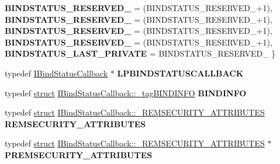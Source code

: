 \begin{DoxyCompactItemize}
{\bfseries B\+I\+N\+D\+S\+T\+A\+T\+U\+S\+\_\+\+R\+E\+S\+E\+R\+V\+E\+D\+\_} = (B\+I\+N\+D\+S\+T\+A\+T\+U\+S\+\_\+\+R\+E\+S\+E\+R\+V\+E\+D\+\_+1), 
\newline
{\bfseries B\+I\+N\+D\+S\+T\+A\+T\+U\+S\+\_\+\+R\+E\+S\+E\+R\+V\+E\+D\+\_} = (B\+I\+N\+D\+S\+T\+A\+T\+U\+S\+\_\+\+R\+E\+S\+E\+R\+V\+E\+D\+\_+1), 
{\bfseries B\+I\+N\+D\+S\+T\+A\+T\+U\+S\+\_\+\+R\+E\+S\+E\+R\+V\+E\+D\+\_} = (B\+I\+N\+D\+S\+T\+A\+T\+U\+S\+\_\+\+R\+E\+S\+E\+R\+V\+E\+D\+\_+1), 
{\bfseries B\+I\+N\+D\+S\+T\+A\+T\+U\+S\+\_\+\+R\+E\+S\+E\+R\+V\+E\+D\+\_} = (B\+I\+N\+D\+S\+T\+A\+T\+U\+S\+\_\+\+R\+E\+S\+E\+R\+V\+E\+D\+\_+1), 
{\bfseries B\+I\+N\+D\+S\+T\+A\+T\+U\+S\+\_\+\+L\+A\+S\+T\+\_\+\+P\+R\+I\+V\+A\+TE} = B\+I\+N\+D\+S\+T\+A\+T\+U\+S\+\_\+\+R\+E\+S\+E\+R\+V\+E\+D\+\_
 \}
\item 
\mbox{\label{interface_i_bind_status_callback_a1aa368a5e85c55d9ef0cddc2bf9f7c4d}} 
typedef \hyperlink{interface_i_bind_status_callback}{I\+Bind\+Status\+Callback} $\ast$ {\bfseries L\+P\+B\+I\+N\+D\+S\+T\+A\+T\+U\+S\+C\+A\+L\+L\+B\+A\+CK}
\item 
\mbox{\label{interface_i_bind_status_callback_aae237331a8551fdefe260e2d4c26cd29}} 
typedef \hyperlink{interfacestruct}{struct} \hyperlink{struct_i_bind_status_callback_1_1__tag_b_i_n_d_i_n_f_o}{I\+Bind\+Status\+Callback\+::\+\_\+tag\+B\+I\+N\+D\+I\+N\+FO} {\bfseries B\+I\+N\+D\+I\+N\+FO}
\item 
\mbox{\label{interface_i_bind_status_callback_a1a7fc2690cdd632a227e27c20390a416}} 
typedef \hyperlink{interfacestruct}{struct} \hyperlink{struct_i_bind_status_callback_1_1___r_e_m_s_e_c_u_r_i_t_y___a_t_t_r_i_b_u_t_e_s}{I\+Bind\+Status\+Callback\+::\+\_\+\+R\+E\+M\+S\+E\+C\+U\+R\+I\+T\+Y\+\_\+\+A\+T\+T\+R\+I\+B\+U\+T\+ES} {\bfseries R\+E\+M\+S\+E\+C\+U\+R\+I\+T\+Y\+\_\+\+A\+T\+T\+R\+I\+B\+U\+T\+ES}
\item 
\mbox{\label{interface_i_bind_status_callback_a4390a1ac0bf6cdd6ef85e04dbe541dc6}} 
typedef \hyperlink{interfacestruct}{struct} \hyperlink{struct_i_bind_status_callback_1_1___r_e_m_s_e_c_u_r_i_t_y___a_t_t_r_i_b_u_t_e_s}{I\+Bind\+Status\+Callback\+::\+\_\+\+R\+E\+M\+S\+E\+C\+U\+R\+I\+T\+Y\+\_\+\+A\+T\+T\+R\+I\+B\+U\+T\+ES} $\ast$ {\bfseries P\+R\+E\+M\+S\+E\+C\+U\+R\+I\+T\+Y\+\_\+\+A\+T\+T\+R\+I\+B\+U\+T\+ES}

\end{DoxyCompactItemize}
